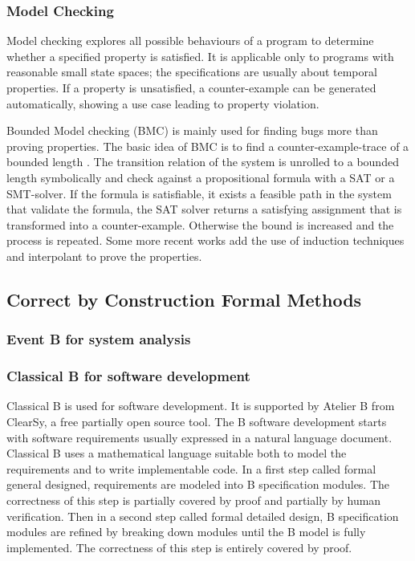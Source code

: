 \documentclass{template/openetcs_report}
\begin{document}
\subsubsection{Model Checking}
\label{sec:Model Checking}

Model checking
\cite{Clarke.Schlingloff.2001}\nocite{Robinson.Voronkov.2001}
explores all possible behaviours of a program to
determine whether a specified property is satisfied.
%
It is applicable only to programs with reasonable small state spaces;
the specifications are usually about temporal properties.
%
If a property is unsatisfied, a counter-example can be generated
automatically,
showing a use case leading to property violation.

Bounded Model checking \cite{biere_symbolic_1999} (BMC) is mainly used
for finding bugs more than proving properties.  The basic idea of BMC
is to find a counter-example-trace of a bounded length . The
transition relation of the system is
unrolled to a bounded length symbolically and check against a
propositional formula with a SAT or a SMT-solver. If the formula is
satisfiable, it exists a feasible path in the system that validate the
formula, the SAT solver returns a satisfying assignment that is
transformed into a counter-example. Otherwise the bound is increased
and the process is repeated. Some  more recent works 
\cite{bradley_sat-based_2011,McMillan-interpo-2003} add the use  of induction techniques and
interpolant to prove the properties.

\subsection{Correct by Construction Formal Methods}
\label{sec:correctbyconstr}


\subsubsection{Event B for system analysis}

\subsubsection{Classical B for software development}

Classical B \cite{Abrial1996} is used for software development. It is supported by Atelier B from ClearSy\cite{atelierb}, a free partially open source tool. The B software development starts with software requirements usually expressed in a natural language document. Classical B uses a mathematical language suitable both to model the requirements and to write implementable code. In a first step called formal general designed, requirements are modeled into B specification modules. The correctness of this step is partially covered by proof and partially by human verification. Then in a second step called formal detailed design, B specification modules are refined by breaking down modules until the B model is fully implemented. The correctness of this step is entirely covered by proof.
\end{document}
